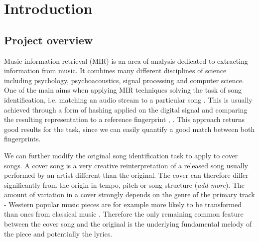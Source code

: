 
\chapter{Introduction}
\label{chap:introduction}
\ifpdf
    \graphicspath{{Introduction/Figures/PNG/}{Introduction/Figures/PDF/}{Introduction/Figures/}}
\else
    \graphicspath{{Introduction/Figures/EPS/}{Introduction/Figures/}}
\fi




  

\section{Project overview}
\label{introduction}

Music information retrieval (MIR) is an area of analysis dedicated to extracting
information from music. It combines many different disciplines of science
including psychology, psychoacoustics, signal processing and computer science.
One of the main aims when applying MIR techniques solving the task of song
identification, i.e. matching an audio stream to a particular song
\cite{weinstein2007music}. This is usually achieved through a form of hashing
applied on the digital signal and comparing the resulting representation to a
reference fingerprint \cite{wang2003industrial}, \cite{haitsma2001robust}. This
approach returns good results for the task, since we can easily quantify a good
match between both fingerprints.

We can further modify the original song identification task to apply to cover
songs. A cover song is a very creative reinterpretation of a released song
usually performed by an artist different than the original. The cover can
therefore differ significantly from the origin in tempo, pitch or song structure
(\textit{add more}). The amount of variation in a cover strongly depends on the
genre of the primary track - Western popular music pieces are for example more
likely to be transformed than ones from classical music
\cite{ellis2007identifyingcover}. Therefore the only remaining common feature
between the cover song and the original is the underlying fundamental melody of
the piece and potentially the lyrics.

